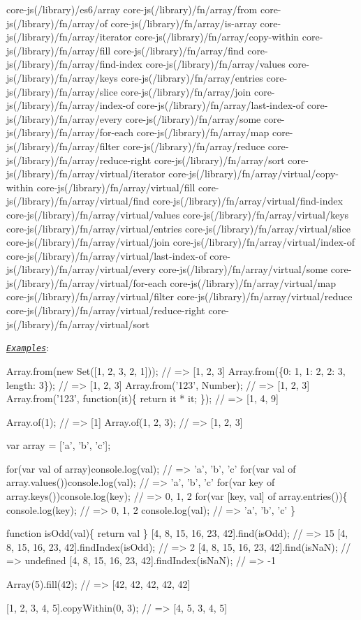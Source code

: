\begin{DoxyCode}
core-js(/library)/es6/array
core-js(/library)/fn/array/from
core-js(/library)/fn/array/of
core-js(/library)/fn/array/is-array
core-js(/library)/fn/array/iterator
core-js(/library)/fn/array/copy-within
core-js(/library)/fn/array/fill
core-js(/library)/fn/array/find
core-js(/library)/fn/array/find-index
core-js(/library)/fn/array/values
core-js(/library)/fn/array/keys
core-js(/library)/fn/array/entries
core-js(/library)/fn/array/slice
core-js(/library)/fn/array/join
core-js(/library)/fn/array/index-of
core-js(/library)/fn/array/last-index-of
core-js(/library)/fn/array/every
core-js(/library)/fn/array/some
core-js(/library)/fn/array/for-each
core-js(/library)/fn/array/map
core-js(/library)/fn/array/filter
core-js(/library)/fn/array/reduce
core-js(/library)/fn/array/reduce-right
core-js(/library)/fn/array/sort
core-js(/library)/fn/array/virtual/iterator
core-js(/library)/fn/array/virtual/copy-within
core-js(/library)/fn/array/virtual/fill
core-js(/library)/fn/array/virtual/find
core-js(/library)/fn/array/virtual/find-index
core-js(/library)/fn/array/virtual/values
core-js(/library)/fn/array/virtual/keys
core-js(/library)/fn/array/virtual/entries
core-js(/library)/fn/array/virtual/slice
core-js(/library)/fn/array/virtual/join
core-js(/library)/fn/array/virtual/index-of
core-js(/library)/fn/array/virtual/last-index-of
core-js(/library)/fn/array/virtual/every
core-js(/library)/fn/array/virtual/some
core-js(/library)/fn/array/virtual/for-each
core-js(/library)/fn/array/virtual/map
core-js(/library)/fn/array/virtual/filter
core-js(/library)/fn/array/virtual/reduce
core-js(/library)/fn/array/virtual/reduce-right
core-js(/library)/fn/array/virtual/sort
\end{DoxyCode}
 \href{http://goo.gl/oaUFUf}{\tt {\itshape Examples}}\+: 
\begin{DoxyCode}
Array.from(new Set([1, 2, 3, 2, 1]));      // => [1, 2, 3]
Array.from(\{0: 1, 1: 2, 2: 3, length: 3\}); // => [1, 2, 3]
Array.from('123', Number);                 // => [1, 2, 3]
Array.from('123', function(it)\{
  return it * it;
\});                                        // => [1, 4, 9]

Array.of(1);       // => [1]
Array.of(1, 2, 3); // => [1, 2, 3]

var array = ['a', 'b', 'c'];

for(var val of array)console.log(val);          // => 'a', 'b', 'c'
for(var val of array.values())console.log(val); // => 'a', 'b', 'c'
for(var key of array.keys())console.log(key);   // => 0, 1, 2
for(var [key, val] of array.entries())\{
  console.log(key);                             // => 0, 1, 2
  console.log(val);                             // => 'a', 'b', 'c'
\}

function isOdd(val)\{
  return val %
\}
[4, 8, 15, 16, 23, 42].find(isOdd);      // => 15
[4, 8, 15, 16, 23, 42].findIndex(isOdd); // => 2
[4, 8, 15, 16, 23, 42].find(isNaN);      // => undefined
[4, 8, 15, 16, 23, 42].findIndex(isNaN); // => -1

Array(5).fill(42); // => [42, 42, 42, 42, 42]

[1, 2, 3, 4, 5].copyWithin(0, 3); // => [4, 5, 3, 4, 5]
\end{DoxyCode}
